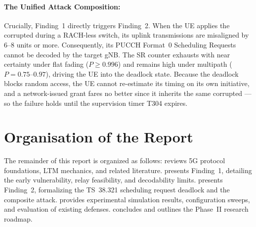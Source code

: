 \paragraph{The Unified Attack Composition:} Crucially, Finding~1 directly triggers Finding~2. When the
UE applies the corrupted \TA{} during a RACH-less switch, its uplink transmissions are misaligned by
6--8 units or more. Consequently, its PUCCH Format~0 Scheduling Requests cannot be decoded by the target
gNB. The SR counter exhausts with near certainty under flat fading ($P \ge 0.996$) and remains high under
multipath ($P = 0.75$--$0.97$), driving the UE into the deadlock state. Because the
deadlock blocks random access, the UE cannot re-estimate its timing on its own initiative, and a
network-issued grant fares no better since it inherits the same corrupted \TA{}---so the failure holds
until the supervision timer T304 expires.

\section{Organisation of the Report}

The remainder of this report is organized as follows:  reviews 5G protocol foundations, LTM
mechanics, and related literature.  presents Finding~1, detailing the early \TA{} vulnerability,
relay feasibility, and decodability limits.  presents Finding~2, formalizing the TS~38.321
scheduling request deadlock and the composite attack.  provides experimental simulation
results, configuration sweeps, and evaluation of existing defenses.  concludes and
outlines the Phase~II research roadmap.
